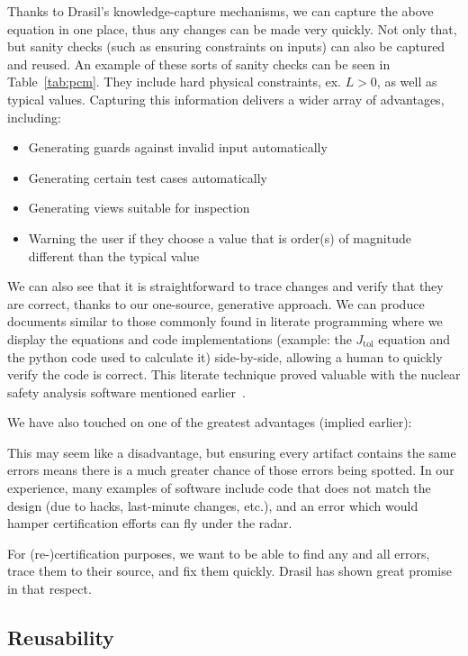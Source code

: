 \documentclass[sigconf]{acmart}
\newcommand{\jtol}{$J_{\mbox{tol}}$}
\begin{document}
{Thanks to Drasil's knowledge-capture mechanisms, we can capture the above 
equation in one place, thus any changes can be made very quickly. Not only 
that, but sanity checks (such as ensuring constraints on inputs) can also be 
captured and reused. An example of these sorts of sanity checks can be seen in 
Table~\ref{tab:pcm}. They include hard physical constraints, ex. $L > 0$, as 
well as typical values. Capturing this information
delivers a wider array of advantages, including:

\begin{itemize}
\item Generating guards against invalid input automatically
\item Generating certain test cases automatically
\item Generating views suitable for inspection
\item Warning the user if they choose a value that is order(s) of magnitude different 
than the typical value
\end{itemize}
We can also see that it is straightforward to trace changes and verify that they 
are correct, thanks to our one-source, generative approach. We can produce 
documents similar to those commonly found in literate programming where we 
display the equations and code implementations (example: the \jtol{} equation 
and the python code used to calculate it) side-by-side, allowing a human to 
quickly verify the code is correct.  This literate technique proved valuable with
the nuclear safety analysis software mentioned
earlier~\cite{SmithAndKoothoor2016}.

We have also touched on one of the greatest advantages (implied 
earlier): 

This 
may seem like a disadvantage, but ensuring every artifact contains the same 
errors means there is a much greater chance of those errors being spotted. In 
our experience, many examples of software include code that does not match the 
design (due to hacks, last-minute changes, etc.), and an error which would 
hamper certification efforts can fly under the radar. 

For (re-)certification purposes, we want to be able to find any and all errors, 
trace them to their source, and fix them quickly. Drasil has shown great 
promise in that respect.

\subsection{Reusability}

}
\end{document}
